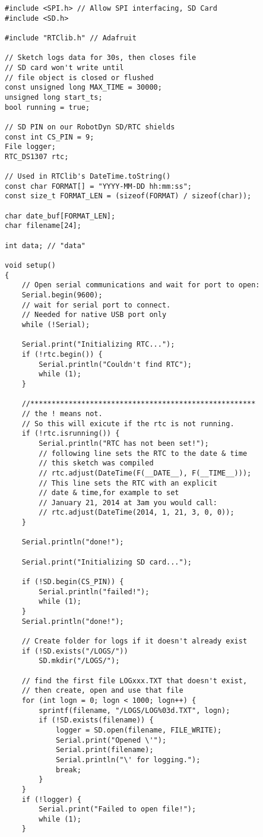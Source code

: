 \begin{lstlisting}[language=Arduino]
#include <SPI.h> // Allow SPI interfacing, SD Card
#include <SD.h>

#include "RTClib.h" // Adafruit

// Sketch logs data for 30s, then closes file
// SD card won't write until
// file object is closed or flushed
const unsigned long MAX_TIME = 30000;
unsigned long start_ts;
bool running = true;

// SD PIN on our RobotDyn SD/RTC shields
const int CS_PIN = 9;
File logger;
RTC_DS1307 rtc;

// Used in RTClib's DateTime.toString()
const char FORMAT[] = "YYYY-MM-DD hh:mm:ss";
const size_t FORMAT_LEN = (sizeof(FORMAT) / sizeof(char));

char date_buf[FORMAT_LEN];
char filename[24];

int data; // "data"

void setup() 
{
	// Open serial communications and wait for port to open:
	Serial.begin(9600);
	// wait for serial port to connect. 
	// Needed for native USB port only
	while (!Serial); 
	
	Serial.print("Initializing RTC...");
	if (!rtc.begin()) {
		Serial.println("Couldn't find RTC");
		while (1);
	}
	
	//*****************************************************
	// the ! means not. 
	// So this will exicute if the rtc is not running.
	if (!rtc.isrunning()) { 
		Serial.println("RTC has not been set!");
		// following line sets the RTC to the date & time  
		// this sketch was compiled
		// rtc.adjust(DateTime(F(__DATE__), F(__TIME__)));
		// This line sets the RTC with an explicit 
		// date & time,for example to set
		// January 21, 2014 at 3am you would call:
		// rtc.adjust(DateTime(2014, 1, 21, 3, 0, 0));
	}
	
	Serial.println("done!");
	
	Serial.print("Initializing SD card...");
	
	if (!SD.begin(CS_PIN)) { 
		Serial.println("failed!");
		while (1);
	}
	Serial.println("done!");
	
	// Create folder for logs if it doesn't already exist
	if (!SD.exists("/LOGS/"))
		SD.mkdir("/LOGS/");
	
	// find the first file LOGxxx.TXT that doesn't exist,
	// then create, open and use that file
	for (int logn = 0; logn < 1000; logn++) {
		sprintf(filename, "/LOGS/LOG%03d.TXT", logn);
		if (!SD.exists(filename)) {
			logger = SD.open(filename, FILE_WRITE);
			Serial.print("Opened \'");
			Serial.print(filename);
			Serial.println("\' for logging.");
			break;
		}
	}
	if (!logger) {
		Serial.print("Failed to open file!");
		while (1);
	}
	

\end{lstlisting}
